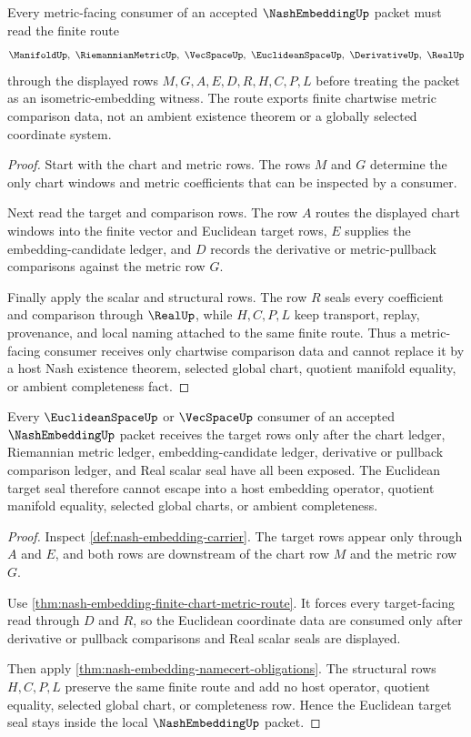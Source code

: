 \begin{theorem}
\label{thm:nash-embedding-finite-chart-metric-route}
Every metric-facing consumer of an accepted $\NashEmbeddingUp$ packet must read the finite route
$$
\ManifoldUp,\ \RiemannianMetricUp,\ \VecSpaceUp,\ \EuclideanSpaceUp,\ \DerivativeUp,\ \RealUp
$$
through the displayed rows $M,G,A,E,D,R,H,C,P,L$ before treating the packet as an isometric-embedding witness. The route exports finite chartwise metric comparison data, not an ambient existence theorem or a globally selected coordinate system.
\end{theorem}
\begin{proof}
Start with the chart and metric rows. The rows $M$ and $G$ determine the only chart windows and metric coefficients that can be inspected by a consumer.

Next read the target and comparison rows. The row $A$ routes the displayed chart windows into the finite vector and Euclidean target rows, $E$ supplies the embedding-candidate ledger, and $D$ records the derivative or metric-pullback comparisons against the metric row $G$.

Finally apply the scalar and structural rows. The row $R$ seals every coefficient and comparison through $\RealUp$, while $H,C,P,L$ keep transport, replay, provenance, and local naming attached to the same finite route. Thus a metric-facing consumer receives only chartwise comparison data and cannot replace it by a host Nash existence theorem, selected global chart, quotient manifold equality, or ambient completeness fact.
\end{proof}

\begin{theorem}
\label{thm:nash-embedding-euclidean-seal-nonescape}
Every $\EuclideanSpaceUp$ or $\VecSpaceUp$ consumer of an accepted $\NashEmbeddingUp$ packet receives the target rows only after the chart ledger, Riemannian metric ledger, embedding-candidate ledger, derivative or pullback comparison ledger, and Real scalar seal have all been exposed. The Euclidean target seal therefore cannot escape into a host embedding operator, quotient manifold equality, selected global charts, or ambient completeness.
\end{theorem}
\begin{proof}
Inspect \autoref{def:nash-embedding-carrier}. The target rows appear only through $A$ and $E$, and both rows are downstream of the chart row $M$ and the metric row $G$.

Use \autoref{thm:nash-embedding-finite-chart-metric-route}. It forces every target-facing read through $D$ and $R$, so the Euclidean coordinate data are consumed only after derivative or pullback comparisons and Real scalar seals are displayed.

Then apply \autoref{thm:nash-embedding-namecert-obligations}. The structural rows $H,C,P,L$ preserve the same finite route and add no host operator, quotient equality, selected global chart, or completeness row. Hence the Euclidean target seal stays inside the local $\NashEmbeddingUp$ packet.
\end{proof}

